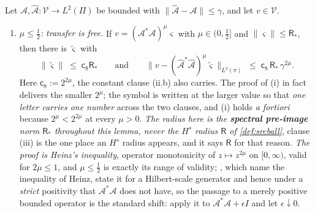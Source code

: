 \begin{lemma}\label{lem:srctransfer}
Let $\mathcal A,\hat{\mathcal A}:\mathcal V\to L^{2}(\Pi)$ be bounded with
$\|\hat{\mathcal A}-\mathcal A\|\le\gamma$, and let $v\in\mathcal V$.
\begin{enumerate}
\item[(i)] \emph{$\mu\le\tfrac12$: transfer is free.} If $v=(\mathcal A^\ast\mathcal A)^{\mu}\varsigma$
with $\mu\in(0,\tfrac12]$ and $\|\varsigma\|\le\mathsf R_\ast$, then there is $\tilde\varsigma$ with
\[
\|\tilde\varsigma\|\;\le\;\mathsf c_8\mathsf R_\ast
\qquad\text{and}\qquad
\big\|v-(\hat{\mathcal A}^\ast\hat{\mathcal A})^{\mu}\tilde\varsigma\big\|_{L^{2}(\pi)}
\;\le\;\mathsf c_8\,\mathsf R_\ast\,\gamma^{2\mu} .
\]
Here $\mathsf c_8:=2^{2\mu}$, the constant clause \textup{(ii.b)} also carries. The proof of
\textup{(i)} in fact delivers the smaller $2^{\mu}$; the symbol is written at the larger value so that
\emph{one letter carries one number} across the two clauses, and \textup{(i)} holds \emph{a fortiori}
because $2^{\mu}<2^{2\mu}$ at every $\mu>0$.
\emph{The radius here is the \textbf{spectral pre-image} norm $\mathsf R_\ast$ throughout this lemma,
never the $H^{s}$ radius $\mathsf R$ of \cref{def:srcball}}, clause (iii) is the one place an
$H^{s}$ radius appears, and it says $\mathsf R$ for that reason.
\emph{The proof is Heinz's inequality}, operator monotonicity of $z\mapsto z^{2\mu}$ on
$[0,\infty)$, valid for $2\mu\le1$, and $\mu\le\tfrac12$ is exactly its range of validity;
\citet[Prop.~8.21]{engl2000}, which \citeauthor{engl2000} name the inequality of Heinz, state it for a
Hilbert-scale generator and hence under a \emph{strict} positivity that $\mathcal A^\ast\mathcal A$
does not have, so the passage to a merely positive bounded operator is the standard shift: apply it to
$\mathcal A^\ast\mathcal A+\epsilon I$ and let $\epsilon\downarrow0$.

\end{enumerate}
\end{lemma}
